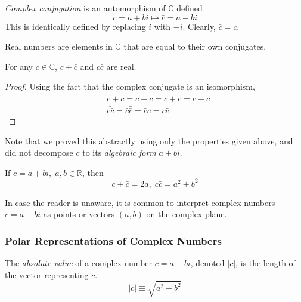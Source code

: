 \documentclass{article}
\begin{document}
    \begin{definition}
      \textit{Complex conjugation} is an automorphism of $\mathbb{C}$ defined
      \begin{equation}
        c = a + b i \mapsto \bar{c} = a - b i
      \end{equation}
      This is identically defined by replacing $i$ with $-i$. Clearly, $\bar{\bar{c}} = c$. 
    \end{definition}

    \begin{definition}
      Real numbers are elements in $\mathbb{C}$ that are equal to their own conjugates. 
    \end{definition}

    \begin{proposition}
      For any $c \in \mathbb{C}$, $c + \bar{c}$ and $c \bar{c}$ are real. 
    \end{proposition}
    \begin{proof}
      Using the fact that the complex conjugate is an isomorphism, 
      \begin{align*}
        & \bar{c + \bar{c}} = \bar{c} + \bar{\bar{c}} = \bar{c} + c = c + \bar{c} \\
        & \bar{ c \bar{c}} = \bar{c} \bar{\bar{c}} = \bar{c} c = c \bar{c}
      \end{align*}
    \end{proof}
    Note that we proved this abstractly using only the properties given above, and did not decompose $c$ to its \textit{algebraic form} $a + b i$. 

    If $c = a + b i, \; a, b \in \mathbb{R}$, then 
    \begin{equation}
      c + \bar{c} = 2a, \; c \bar{c} = a^2 + b^2
    \end{equation}

    In case the reader is unaware, it is common to interpret complex numbers $c = a + b i$ as points or vectors $(a, b)$ on the complex plane. 

    \subsubsection{Polar Representations of Complex Numbers}

      \begin{definition}
        The \textit{absolute value} of a complex number $c = a + b i$, denoted $|c|$, is the length of the vector representing $c$. 
        \begin{equation}
          |c| \equiv \sqrt{a^2 + b^2}
        \end{equation}
      \end{definition}
\end{document}
